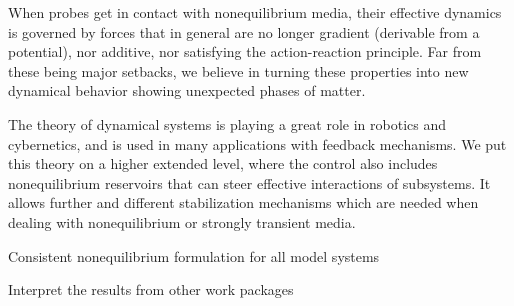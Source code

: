 \begin{workpackage}[id=WPcore,wphases=0-48,
  short=Gen. Theory, %
  title=General Theory, %
  lead=KUL,
  KULRM=36,UNIPDRM=6]
\begin{wpdescription}
\printbibliography[heading=proposal-bib,env=proposal-env]

\end{wpdescription}

\begin{tasklist}

\begin{task}[title=Theory of statistical forces outside equilibrium,id=core-t1,lead=KUL,partners={UNIPD},wphases={0-24!0.5,12-30}]
When probes get in contact with nonequilibrium media, their effective dynamics is governed
by forces that in general are no longer gradient (derivable from a potential), nor additive,
nor satisfying the action-reaction principle. Far from these being major setbacks, we
believe in turning these properties into new dynamical behavior showing unexpected phases of
matter.
\end{task}

\begin{task}[title=Stability and control theory,id=core-t2,PM=12,lead=KUL,wphases=12-36!0.5]
The theory of dynamical systems is playing a great role in robotics and cybernetics, and is
used in many applications with feedback mechanisms. We put this theory on a higher extended
level, where the control also includes nonequilibrium reservoirs that can steer effective
interactions of subsystems.
%
It allows further and different stabilization mechanisms which are needed when dealing with
nonequilibrium or strongly transient media.
\end{task}

\end{tasklist}

\begin{wpdelivs}
  \begin{wpdeliv}[due=18,id=core-d1,dissem=PU,nature=DEM,lead=KUL,miles=framework]
      {Consistent nonequilibrium formulation for all model systems}
  \end{wpdeliv}
  \begin{wpdeliv}[due=36,id=core-d2,dissem=PU,nature=DEM,lead=KUL,miles=final]
      {Interpret the results from other work packages}
  \end{wpdeliv}
\end{wpdelivs}

\end{workpackage}
